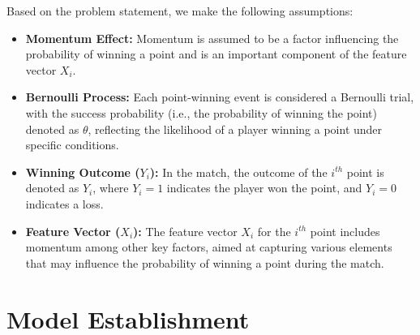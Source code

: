 \documentclass{mcmthesis}
\begin{document}
Based on the problem statement, we make the following assumptions:
\begin{itemize}
  \item \textbf{Momentum Effect:}
  Momentum is assumed to be a factor influencing the probability of winning a point and is an important component of the feature vector $X_i$.
  \item \textbf{Bernoulli Process:}
  Each point-winning event is considered a Bernoulli trial, with the success probability (i.e., the probability of winning the point) denoted as $\theta$, reflecting the likelihood of a player winning a point under specific conditions.
  \item \textbf{Winning Outcome ($Y_i$):} 
  In the match, the outcome of the $i^{th}$ point is denoted as $Y_i$, where $Y_i = 1$ indicates the player won the point, and $Y_i = 0$ indicates a loss.
  \item \textbf{Feature Vector ($X_i$):}
  The feature vector $X_i$ for the $i^{th}$ point includes momentum among other key factors, aimed at capturing various elements that may influence the probability of winning a point during the match.
\end{itemize}

\section{Model Establishment}
\end{document}
